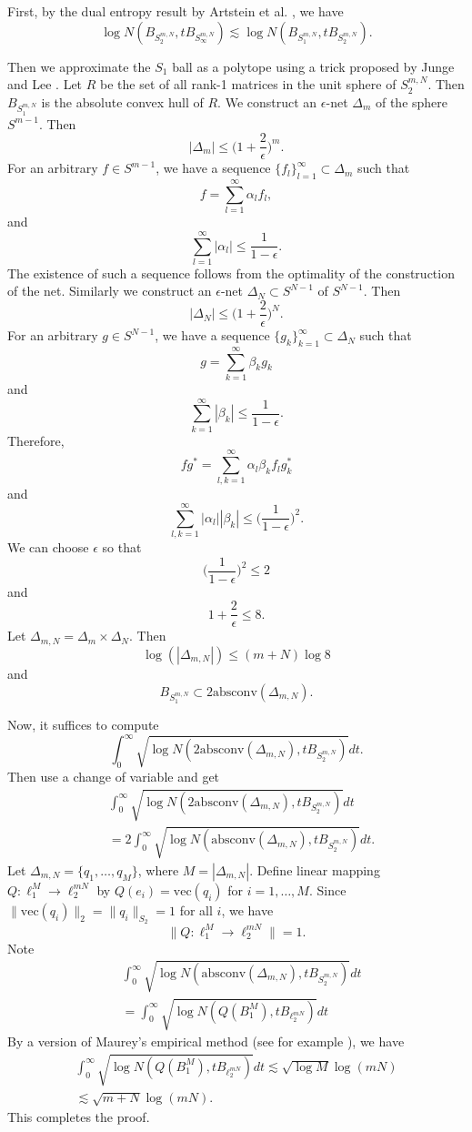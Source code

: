 \documentclass[11pt,journal]{IEEEtran}
\newcommand{\norm}[1]{\|{#1}\|}
\begin{document}
\begin{IEEEproof}
First, by the dual entropy result by Artstein et al. \cite{Artstein2004}, we have
\[
\log N(B_{S_2^{m,N}}, tB_{S_\infty^{m,N}}) \lesssim \log N(B_{S_1^{m,N}}, tB_{S_2^{m,N}}).
\]

Then we approximate the $S_1$ ball as a polytope using a trick proposed by Junge and Lee \cite{Junge2017}. 
Let $R$ be the set of all rank-1 matrices in the unit sphere of $S_2^{m,N}$.
Then $B_{S_1^{m,N}}$ is the absolute convex hull of $R$.
We construct an $\epsilon$-net $\Delta_m$ of the sphere $S^{m-1}$. Then
\[
|\Delta_m| \leq \Big(1+\frac{2}{\epsilon}\Big)^m.
\]
For an arbitrary $f \in S^{m-1}$, we have a sequence $\{f_l\}_{l=1}^\infty \subset \Delta_m$ such that
\[
f = \sum_{l=1}^\infty \alpha_l f_l,
\]
and
\[
\sum_{l=1}^\infty |\alpha_l| \leq \frac{1}{1-\epsilon}.
\]
The existence of such a sequence follows from the optimality of the construction of the net.
Similarly we construct an $\epsilon$-net $\Delta_N \subset S^{N-1}$ of $S^{N-1}$. Then
\[
|\Delta_N| \leq \Big(1+\frac{2}{\epsilon}\Big)^N.
\]
For an arbitrary $g \in S^{N-1}$, we have a sequence $\{g_k\}_{k=1}^\infty \subset \Delta_N$ such that
\[
g = \sum_{k=1}^\infty \beta_k g_k
\]
and
\[
\sum_{k=1}^\infty |\beta_k| \leq \frac{1}{1-\epsilon}.
\]
Therefore,
\[
fg^* = \sum_{l,k=1}^\infty \alpha_l \beta_k f_l g_k^*
\]
and
\[
\sum_{l,k=1}^\infty |\alpha_l| |\beta_k|
\leq \Big(\frac{1}{1-\epsilon}\Big)^2.
\]
We can choose $\epsilon$ so that
\[
\Big(\frac{1}{1-\epsilon}\Big)^2 \leq 2
\]
and
\[
1+\frac{2}{\epsilon} \leq 8.
\]
Let $\Delta_{m,N} = \Delta_m \times \Delta_N$. Then
\[
\log(|\Delta_{m,N}|) \leq (m+N) \log 8
\]
and
\[
B_{S_1^{m,N}} \subset 2 \mathrm{absconv}(\Delta_{m,N}).
\]

Now, it suffices to compute
\[
\int_0^\infty \sqrt{\log N(2 \mathrm{absconv}(\Delta_{m,N}), tB_{S_2^{m,N}})} dt.
\]
Then use a change of variable and get
\begin{align*}
& \int_0^\infty \sqrt{\log N(2 \mathrm{absconv}(\Delta_{m,N}), tB_{S_2^{m,N}})} dt \\
& = 2 \int_0^\infty \sqrt{\log N(\mathrm{absconv}(\Delta_{m,N}), tB_{S_2^{m,N}})} dt.
\end{align*}
Let $\Delta_{m,N} = \{q_1,\dots,q_M\}$, where $M = |\Delta_{m,N}|$.
Define linear mapping $Q: \ell_1^M \to \ell_2^{mN}$ by $Q(e_i) = \mathrm{vec}(q_i)$ for $i=1,\dots,M$.
Since $\norm{\mathrm{vec}(q_i)}_2 = \norm{q_i}_{S_2} = 1$ for all $i$, we have
\[
\norm{Q: \ell_1^M \to \ell_2^{mN}} = 1.
\]
Note
\begin{align*}
& \int_0^\infty \sqrt{\log N(\mathrm{absconv}(\Delta_{m,N}), tB_{S_2^{m,N}})} dt \\
& = \int_0^\infty \sqrt{\log N(Q(B_1^M), tB_{\ell_2^{mN}})} dt
\end{align*}
By a version of Maurey's empirical method (see for example \cite[Proposition 3.2]{Junge2017}), we have
\begin{align*}
\int_0^\infty \sqrt{\log N(Q(B_1^M), tB_{\ell_2^{mN}})} dt
\lesssim \sqrt{\log M} \log (mN) \\
\lesssim \sqrt{m+N} \log (mN).
\end{align*}
This completes the proof.
\end{IEEEproof}
\end{document}
